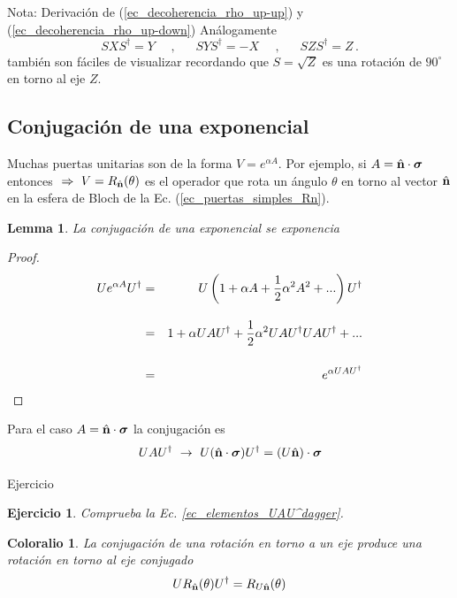 \documentclass[a4paper,11pt]{book} %
\newtheorem{lemma_contador}{Lemma}
\newcommand{\Lemma}[1]{
		\begin{mybox_gray2}{}
			\begin{lemma_contador}
				 #1 
			\end{lemma_contador} 
		\end{mybox_gray2}
	}
\newtheorem{corolario_contador}{Coloralio}
\newcommand{\Corolario}[1]{
		\begin{mybox_gray2}{}
			\begin{corolario_contador}
				 #1 
			\end{corolario_contador} 
		\end{mybox_gray2}
	}
\newtheorem{ejercicio_contador}{Ejercicio}
\newcommand{\Ejercicio}[1]{
		\begin{mybox_gray}{Ejercicio} 
			\begin{ejercicio_contador}
				 #1 
			\end{ejercicio_contador} 
		\end{mybox_gray}
	}
\numberwithin{equation}{chapter}
\begin{document}
\begin{mybox_blue}{Nota: Derivación de (\ref{ec_decoherencia_rho_up-up}) y  (\ref{ec_decoherencia_rho_up-down})}
Análogamente
	\begin{equation*}
	S X S^\dagger  = Y ~~~~~~, ~~~~~~~ 
	S Y S^\dagger = -X ~~~~~~, ~~~~~~~ 
	S Z S^\dagger = Z \, .
	\end{equation*}
también  son fáciles de visualizar recordando que  $S=\sqrt{Z}$ es una rotación de $90^\circ$ en torno al eje $Z$.


        \subsection{Conjugación de una exponencial}

Muchas puertas unitarias son de la forma $V = e^{\alpha A}$. Por ejemplo, si  $A = \hat{\bf n}\cdot \boldsymbol{\sigma} $ entonces $  ~\Rightarrow ~V= R_{\hat{\bf n}}(\theta)$ es el operador que rota un ángulo $\theta$ en torno al vector $\hat{\bf n}$ en la esfera de Bloch de la Ec. (\ref{ec_puertas_simples_Rn}).

	\Lemma{La conjugación de una exponencial se exponencia}
	
	\begin{proof}
	\begin{eqnarray}
	U e^{\alpha A} U^\dagger &=&  U \left(1 + \alpha A  + \frac{1}{2} \alpha^2 A^2 + ... \right) U^\dagger \\ \rule{0mm}{8mm}
	&=& 1 + \alpha UAU^\dagger + \frac{1}{2}\alpha^2 UAU^\dagger U AU^\dagger + ... \\ \rule{0mm}{8mm}
	&=& e^{ \alpha UAU^\dagger} 
	\end{eqnarray}
	\end{proof}

Para el caso $A = \hat{\bf n}\cdot \boldsymbol{\sigma} $  la conjugación es
	\begin{equation} \label{ec_elementos_UAU^dagger}
	U A U^\dagger ~\to ~U (\hat{\bf n}\cdot \boldsymbol{\sigma} ) U^\dagger = (U\hat{\bf n})\cdot  \boldsymbol{\sigma}
	\end{equation}

	\Ejercicio{Comprueba la Ec. \ref{ec_elementos_UAU^dagger}.}

	\Corolario{La conjugación de una rotación en torno a un eje produce una rotación en torno al eje conjugado
	\begin{equation}
	U R_{\hat{\bf n}}(\theta) U^\dagger = R_{U\hat{\bf n}}(\theta)
	\end{equation}
	}
	

\end{mybox_blue}
\end{document}
